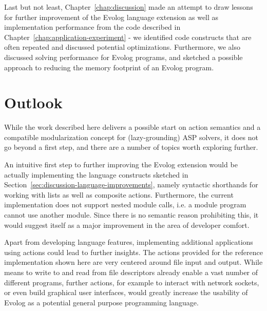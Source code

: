 Last but not least, Chapter~\ref{chap:discussion} made an attempt to draw lessons for further improvement of the Evolog language extension as well as implementation performance from the code described in Chapter~\ref{chap:application-experiment} - we identified code constructs that are often repeated and discussed potential optimizations. Furthermore, we also discussed solving performance for Evolog programs, and sketched a possible approach to reducing the memory footprint of an Evolog program.

\section{Outlook}

While the work described here delivers a possible start on action semantics and a compatible modularization concept for (lazy-grounding) ASP solvers, it does not go beyond a first step, and there are a number of topics worth exploring further.

An intuitive first step to further improving the Evolog extension would be actually implementing the language constructs sketched in Section~\ref{sec:discussion-language-improvements}, namely syntactic shorthands for working with lists as well as composite actions. Furthermore, the current implementation does not support nested module calls, i.e. a module program cannot use another module. Since there is no semantic reason prohibiting this, it would suggest itself as a major improvement in the area of developer comfort.

Apart from developing language features, implementing additional applications using actions could lead to further insights. The actions provided for the reference implementation shown here are very centered around file input and output. While means to write to and read from file descriptors already enable a vast number of different programs, further actions, for example to interact with network sockets, or even build graphical user interfaces, would greatly increase the usability of Evolog as a potential general purpose programming language.